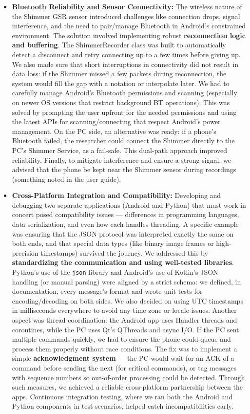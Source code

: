 \documentclass[11pt,a4paper]{report}
\begin{document}
\begin{itemize}
\item \textbf{Bluetooth Reliability and Sensor Connectivity:} The wireless nature
  of the Shimmer GSR sensor introduced challenges like connection drops,
  signal interference, and the need to pair/manage Bluetooth in
  Android's constrained environment. The solution involved implementing
  robust \textbf{reconnection logic and buffering}. The ShimmerRecorder class was
  built to automatically detect a disconnect and retry connecting up to
  a few times before giving
  up\cite{ContactlessStressThermal2022}.
  We also made sure that short interruptions in connectivity did not
  result in data loss: if the Shimmer missed a few packets during
  reconnection, the system would fill the gap with a notation or
  interpolate later. We had to carefully manage Android's Bluetooth
  permissions and scanning (especially on newer OS versions that
  restrict background BT operations). This was solved by prompting the
  user upfront for the needed permissions and using the latest APIs for
  scanning/connecting that respect Android's power management. On the PC
  side, an alternative was ready: if a phone's Bluetooth failed, the
  researcher could connect the Shimmer directly to the PC's Shimmer
  Service, as a fail-safe. This dual-path approach improved reliability.
  Finally, to mitigate interference and ensure a strong signal, we
  advised that the phone be kept near the Shimmer sensor during
  recordings (something noted in the user guide).

\item \textbf{Cross-Platform Integration and Compatibility:} Developing and
  debugging two separate applications (Android and Python) that must
  work in concert posed compatibility issues --- differences in
  programming languages, data serialization, and even how each handles
  threading. A specific example was ensuring that the JSON protocol was
  interpreted exactly the same on both ends, and that special data types
  (like binary image frames or high-precision timestamps) survived the
  journey. We addressed this by \textbf{standardizing the communication and
  using well-tested libraries}. Python's use of the \texttt{json} library and
  Android's use of Kotlin's JSON handling (or manual parsing) were
  aligned by a strict schema: we defined, in documentation, every
  message's format and wrote unit tests for encoding/decoding on both
  sides. We also decided on using UTC timestamps in milliseconds
  everywhere to avoid any time zone or locale issues. Another aspect was
  thread coordination: the Android app uses Handler threads and
  coroutines, while the PC uses Qt's QThreads and async I/O. If the PC
  sent multiple commands quickly, we had to ensure the phone could queue
  and process them properly without race conditions. The fix was to
  implement a simple \textbf{acknowledgment system} --- the PC would wait for
  an ACK of a command before sending the next (for critical commands),
  or tag messages with sequence numbers so out-of-order processing could
  be detected. Through such measures, we achieved a reliable
  cross-platform partnership between the apps. Continuous integration
  testing, where we ran both the Android and Python components in test
  scenarios, helped catch incompatibilities early.


\end{itemize}
\end{document}
